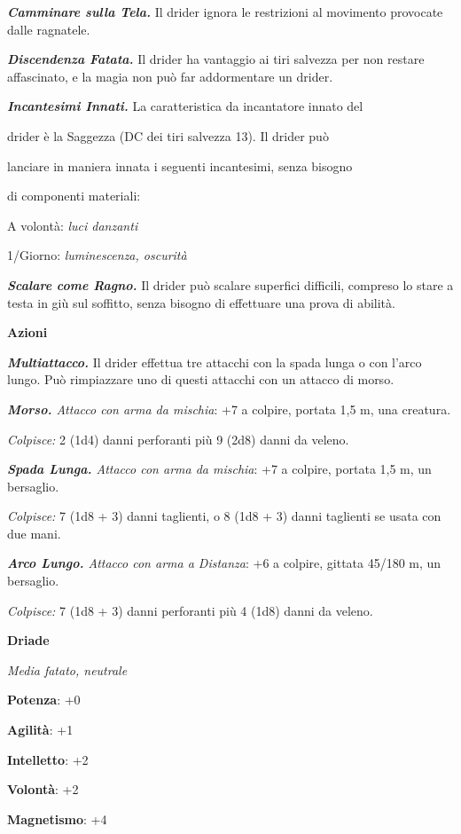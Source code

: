 \begin{multicols}{2}
\emph{\textbf{Camminare sulla Tela.}} Il drider ignora le restrizioni al
movimento provocate dalle ragnatele.

\emph{\textbf{Discendenza Fatata.}} Il drider ha vantaggio ai tiri
salvezza per non restare affascinato, e la magia non può far
addormentare un drider.

\emph{\textbf{Incantesimi Innati.}} La caratteristica da incantatore
innato del

drider è la Saggezza (DC dei tiri salvezza 13). Il drider può

lanciare in maniera innata i seguenti incantesimi, senza bisogno

di componenti materiali:

A volontà: \emph{luci danzanti}

1/Giorno: \emph{luminescenza, oscurità}

\emph{\textbf{Scalare come Ragno.}} Il drider può scalare superfici
difficili, compreso lo stare a testa in giù sul soffitto, senza bisogno
di effettuare una prova di abilità.

\textbf{Azioni}

\emph{\textbf{Multiattacco.}} Il drider effettua tre attacchi con la
spada lunga o con l'arco lungo. Può rimpiazzare uno di questi attacchi
con un attacco di morso.

\emph{\textbf{Morso.} Attacco con arma da mischia}: +7 a colpire,
portata 1,5 m, una creatura.

\emph{Colpisce:} 2 (1d4) danni perforanti più 9 (2d8) danni da veleno.

\emph{\textbf{Spada Lunga.} Attacco con arma da mischia}: +7 a colpire,
portata 1,5 m, un bersaglio.

\emph{Colpisce:} 7 (1d8 + 3) danni taglienti, o 8 (1d8 + 3) danni
taglienti se usata con due mani.

\emph{\textbf{Arco Lungo.} Attacco con arma a Distanza}: +6 a colpire,
gittata 45/180 m, un bersaglio.

\emph{Colpisce:} 7 (1d8 + 3) danni perforanti più 4 (1d8) danni da
veleno.

\textbf{Driade}

\emph{Media fatato, neutrale}

\textbf{Potenza}: +0

\textbf{Agilità}: +1

\textbf{Intelletto}: +2

\textbf{Volontà}: +2

\textbf{Magnetismo}: +4


\end{multicols}
